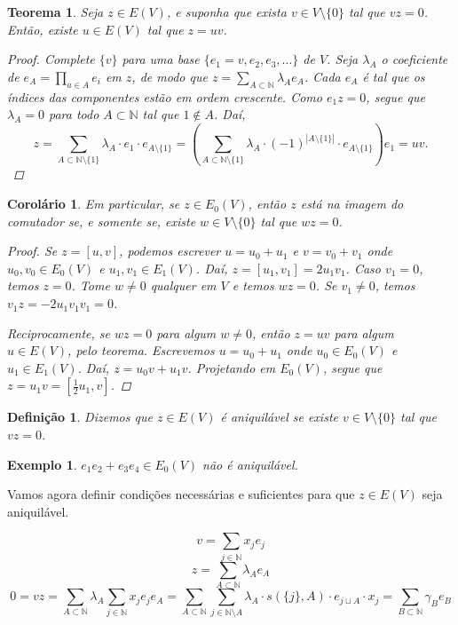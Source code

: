 \documentclass{article}
\newcommand{\N}{\mathbb{N}}
\newtheorem*{theorem}{Teorema}
\newtheorem*{corollary}{Corolário}
\newtheorem*{definition}{Definição}
\newtheorem*{example}{Exemplo}
\begin{document}
\begin{theorem}
    Seja $z \in E(V)$, e suponha que exista $v \in V \setminus \{0\}$ tal que $vz = 0$. Então, existe $u \in E(V)$ tal que $z = uv$.
    \begin{proof}
        Complete $\{v\}$ para uma base $\{e_1 = v, e_2, e_3, \dots\}$ de $V$. Seja $\lambda_A$ o coeficiente de $e_A = \prod_{a \in A} e_i$ em $z$, de modo que $z = \sum_{A \subset \N} \lambda_{A} e_{A}$. Cada $e_A$ é tal que os índices das componentes estão em ordem crescente. Como $e_1 z = 0$, segue que $\lambda_A = 0$ para todo $A \subset \N$ tal que $1 \not\in A$. Daí,
        \[
            z = \sum_{A \subset \N \setminus \{1\}} \lambda_A \cdot e_1 \cdot e_{A \setminus \{1\}} = \left(\sum_{A \subset \N \setminus \{1\}} \lambda_A \cdot {(-1)}^{|A \setminus \{1\}|}  \cdot e_{A \setminus \{1\}}\right) e_1 = uv.
        \]
    \end{proof}
\end{theorem}
\begin{corollary}
    Em particular, se $z \in E_0(V)$, então $z$ está na imagem do comutador se, e somente se, existe $w \in V \setminus \{0\}$ tal que $wz = 0$.
    \begin{proof}
        Se $z = [u, v]$, podemos escrever $u = u_0 + u_1$ e $v = v_0 + v_1$ onde $u_0, v_0 \in E_0(V)$ e $u_1, v_1 \in E_1(V)$. Daí, $z = [u_1, v_1] = 2u_1 v_1$. Caso $v_1 = 0$, temos $z = 0$. Tome $w \neq 0$ qualquer em $V$ e temos $wz = 0$. Se $v_1 \neq 0$, temos $v_1 z = -2 u_1 v_1 v_1 = 0$.

        Reciprocamente, se $wz = 0$ para algum $w \neq 0$, então $z = uv$ para algum $u \in E(V)$, pelo teorema. Escrevemos $u = u_0 + u_1$ onde $u_0 \in E_0(V)$ e $u_1 \in E_1(V)$. Daí, $z = u_0 v + u_1 v$. Projetando em $E_0(V)$, segue que $z = u_1 v =  \left [ \frac12u_1, v \right ]$.
    \end{proof}
\end{corollary}
\begin{definition}
    Dizemos que $z \in E(V)$ é \emph{aniquilável} se existe $v \in V \setminus \{0\}$ tal que $vz = 0$.
\end{definition}

\begin{example}
    $e_1e_2 + e_3e_4 \in E_0(V)$ não é aniquilável.
\end{example}

Vamos agora definir condições necessárias e suficientes para que $z \in E(V)$ seja aniquilável.

\[
    v = \sum_{j \in \N} x_j e_j
\]
\[
    z = \sum_{A \subset \N} \lambda_A e_A
\]
\[
    0 = vz = \sum_{A \subset \N} \lambda_A \sum_{j \in \N} x_j e_j e_A = \sum_{A \subset \N} \sum_{j \in \N \setminus A} \lambda_A \cdot s(\{j\}, A) \cdot  e_{j \sqcup A} \cdot x_j = \sum_{B \subset \N} \gamma_B e_B
\]
\end{document}
